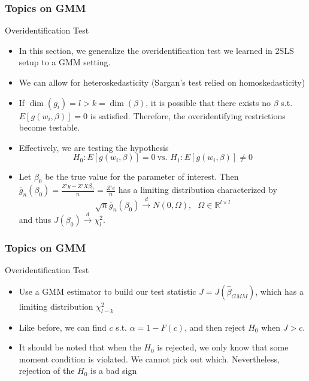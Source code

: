 \documentclass{beamer}
\begin{document}
\begin{frame}
\frametitle{Topics on GMM}
Overidentification Test
\begin{itemize}
\item In this section, we generalize the overidentification test we learned in 2SLS setup to a GMM setting.
\item We can allow for heteroskedasticity (Sargan's test relied on homoskedasticity)
\item  If $\dim(g_i)=l>k=\dim(\beta)$, it is possible that there exists no $\beta$ s.t. $E[g(w_i,\beta)]=0$ is satisfied. Therefore, the overidentifying restrictions become testable.
\item Effectively, we are testing the hypothesis
\[
H_0: E[g(w_i,\beta)]=0 \ \text{vs. } H_1: E[g(w_i,\beta)]\neq0
\]
\item Let $\beta_0$ be the true value for the parameter of interest. Then $\bar{g}_n(\beta_0)=\frac{Z'y-Z'X\beta_0}{n}=\frac{Z'e}{n}$ has a limiting distribution characterized by
\[
\sqrt{n}\bar{g}_n(\beta_0) \xrightarrow{d}N(0,\Omega),\ \ \ \Omega\in\mathbb{R}^{l\times l}
\]
and thus $J(\beta_0)\xrightarrow{d}\chi^2_l$.
\end{itemize}
\end{frame}


\begin{frame}
\frametitle{Topics on GMM}
Overidentification Test
\begin{itemize}
\item Use a GMM estimator to build our test statistic $J=J(\hat{\beta}_{GMM})$, which has a limiting distribution $\chi^2_{l-k}$
\item Like before, we can find $c$ s.t. $\alpha=1-F(c)$, and then reject $H_0$ when $J>c$.
\item It should be noted that when the $H_0$ is rejected, we only know that some moment condition is violated. We cannot pick out which. Nevertheless, rejection of the $H_0$ is a bad sign
\end{itemize}
\end{frame}
\end{document}
